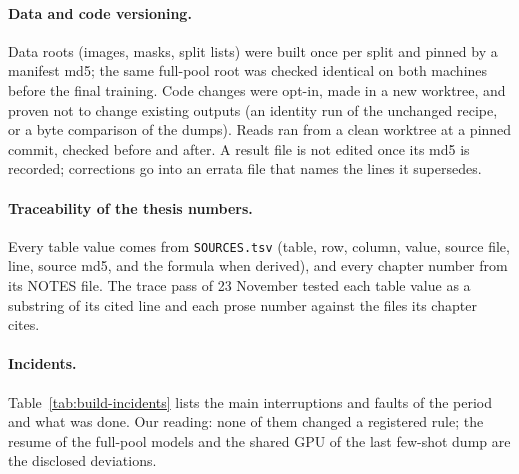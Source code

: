 \paragraph{Data and code versioning.} Data roots (images, masks, split lists) were built once per split and pinned by a manifest
md5; the same full-pool root was checked identical on both machines before the final training. Code changes were opt-in, made in a
new worktree, and proven not to change existing outputs (an identity run of the unchanged recipe, or a byte comparison of the
dumps). Reads ran from a clean worktree at a pinned commit, checked before and after. A result file is not edited once its md5 is
recorded; corrections go into an errata file that names the lines it supersedes.

\paragraph{Traceability of the thesis numbers.} Every table value comes from \texttt{SOURCES.tsv} (table, row, column, value,
source file, line, source md5, and the formula when derived), and every chapter number from its NOTES file. The trace pass of 23
November tested each table value as a substring of its cited line and each prose number against the files its chapter cites.

\paragraph{Incidents.}\label{sec:build-incidents} Table~\ref{tab:build-incidents} lists the main interruptions and faults of the period
and what was done. Our reading: none of them changed a registered rule; the resume of the full-pool models and the shared GPU of the
last few-shot dump are the disclosed deviations.

